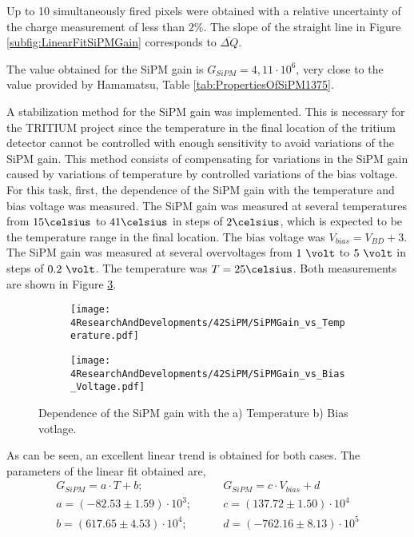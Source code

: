 
Up to 10 simultaneously fired pixels were obtained with a relative uncertainty of the charge measurement of less than $2\%$. The slope of the straight line in Figure \ref{subfig:LinearFitSiPMGain} corresponds to $\overline{\Delta Q}$.

The value obtained for the SiPM gain is $G_{SiPM}=4,11\cdot{} 10^{6}$, very close to the value provided by Hamamatsu, Table \ref{tab:PropertiesOfSiPM1375}.

A stabilization method for the SiPM gain was implemented. This is necessary for the TRITIUM project since the temperature in the final location of the tritium detector cannot be controlled with enough sensitivity to avoid variations of the SiPM gain. This method consists of compensating for variations in the SiPM gain caused by variations of temperature by controlled variations of the bias voltage. For this task, first, the dependence of the SiPM gain with the temperature and bias voltage was measured. The SiPM gain was measured at several temperatures from $15\celsius$ to $41\celsius$ in steps of $2\celsius$, which is expected to be the temperature range in the final location. The bias voltage was $V_{bias} = V_{BD}+3$. The SiPM gain was measured at several overvoltages from $1~\volt$ to $5~\volt$ in steps of $0.2~\volt$. The temperature was $T=25\celsius$. Both measurements are shown in Figure \ref{fig:SiPMGainDependance}. 

\begin{figure}
\centering
    \begin{subfigure}[b]{0.47\textwidth}
    \centering
    \texttt{[image: 4ResearchAndDevelopments/42SiPM/SiPMGain\_vs\_Temperature.pdf]}  
    \caption{\label{subfig:SiPMGainvsTemperature}}
    \end{subfigure}
    \hfill
    \begin{subfigure}[b]{0.47\textwidth}
    \centering
    \texttt{[image: 4ResearchAndDevelopments/42SiPM/SiPMGain\_vs\_Bias\_Voltage.pdf]}  
    \caption{\label{subfig:SiPMGainvsBiasVoltage}}
    \end{subfigure}
 \caption{Dependence of the SiPM gain with the a) Temperature b) Bias votlage.}
 \label{fig:SiPMGainDependance}
\end{figure}

As can be seen, an excellent linear trend is obtained for both cases. The  parameters of the linear fit obtained are,
\begin{equation*}
\begin{split}
G_{SiPM}=a \cdot{} T + b;& \qquad G_{SiPM}=c \cdot{} V_{bias} + d\\
a=\left( -82.53 \pm 1.59 \right) \cdot{} 10^{3};& \qquad c=\left( 137.72 \pm 1.50 \right) \cdot{} 10^{4}\\
b=\left( 617.65 \pm 4.53 \right) \cdot{} 10^{4};& \qquad d=\left( -762.16 \pm 8.13 \right) \cdot{} 10^{5} \\
\label{SiPMGainVSTempV}
\end{split}
\end{equation*} 

